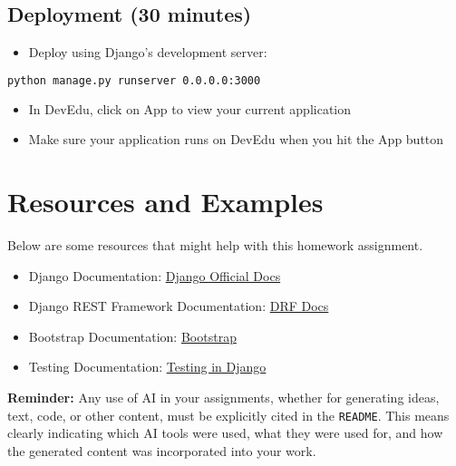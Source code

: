 \documentclass{article}
\begin{document}
\subsection{Deployment (30 minutes)}
\begin{itemize}
    \item Deploy using Django's development server:
\end{itemize}
\begin{lstlisting}[style=customcode,language=bash]
python manage.py runserver 0.0.0.0:3000
\end{lstlisting}

\begin{itemize}
    \item In DevEdu, click on App to view your current application
    \item Make sure your application runs on DevEdu when you hit the App button
\end{itemize}

\section{Resources and Examples}
Below are some resources that might help with this homework assignment. 

\begin{itemize}
    \item Django Documentation: \href{https://docs.djangoproject.com/en/stable/}{Django Official Docs}
    \item Django REST Framework Documentation: \href{https://www.django-rest-framework.org/}{DRF Docs}
    \item Bootstrap Documentation: \href{https://getbootstrap.com/docs/5.3/getting-started/introduction/}{Bootstrap}
    \item Testing Documentation: \href{https://docs.djangoproject.com/en/stable/topics/testing/}{Testing in Django}
\end{itemize}

\textbf{Reminder:} Any use of AI in your assignments, whether for generating ideas, text, code, or other content, must be explicitly cited in the \texttt{README}.  This means clearly indicating which AI tools were used, what they were used for, and how the generated content was incorporated into your work.
\end{document}
